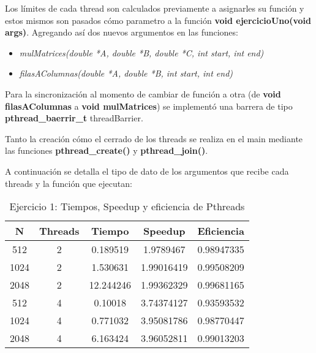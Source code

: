 Los límites de cada thread son calculados previamente a asignarles su función y estos mismos son pasados cómo parametro a la función \textbf{void ejercicioUno(void args)}. Agregando así dos nuevos argumentos en las funciones:
\begin{itemize}
\item \textit{mulMatrices(double *A, double *B, double *C, int start, int end)}
\item \textit{filasAColumnas(double *A, double *B, int start, int end)} 
\end{itemize}
Para la sincronización al momento de cambiar de función a otra (de \textbf{void filasAColumnas} a \textbf{void mulMatrices}) se implementó una barrera de tipo \textbf{pthread\_baerrir\_t} threadBarrier.


Tanto la creación cómo el cerrado de los threads se realiza en el main mediante las funciones \textbf{pthread\_create()} y \textbf{pthread\_join()}.


A continuación se detalla el tipo de dato de los argumentos que recibe cada threads y la función que ejecutan:



\begin{table}[htbp]
\centering
\caption{Ejercicio 1: Tiempos, Speedup y eficiencia de Pthreads}
\begin{tabular}{|c|c|c|c|c|}
\hline
\textbf{N} & \textbf{Threads} & \textbf{Tiempo} & \textbf{Speedup} & \textbf{Eficiencia} \\ \hline
512        & 2                & 0.189519        & 1.9789467        & 0.98947335          \\ \hline
1024       & 2                & 1.530631        & 1.99016419       & 0.99508209          \\ \hline
2048       & 2                & 12.244246       & 1.99362329       & 0.99681165          \\ \hline
512        & 4                & 0.10018         & 3.74374127       & 0.93593532          \\ \hline
1024       & 4                & 0.771032        & 3.95081786       & 0.98770447          \\ \hline
2048       & 4                & 6.163424        & 3.96052811       & 0.99013203          \\ \hline
\end{tabular}
\end{table}
